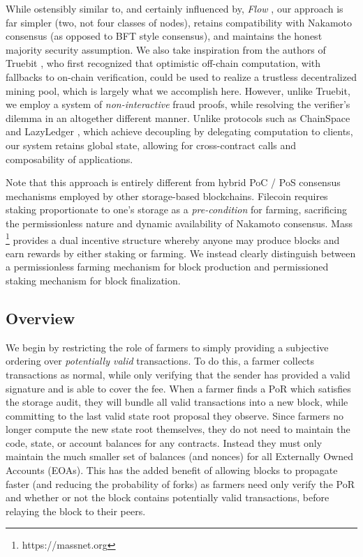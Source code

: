 \documentclass[conference]{IEEEtran}
\begin{document}
While ostensibly similar to, and certainly influenced by, \textit{Flow} \cite{ hentschel2019flow1, hentschel2020flow2, hentschel2019flow3}, our approach is far simpler (two, not four classes of nodes), retains compatibility with Nakamoto consensus (as opposed to BFT style consensus), and maintains the honest majority security assumption. We also take inspiration from the authors of Truebit \cite{teutsch2018truebit}, who first recognized that optimistic off-chain computation, with fallbacks to on-chain verification, could be used to realize a trustless decentralized mining pool, which is largely what we accomplish here. However, unlike Truebit, we employ a system of \textit{non-interactive} fraud proofs, while resolving the verifier’s dilemma in an altogether different manner. Unlike protocols such as ChainSpace \cite{al2017chainspace} and LazyLedger \cite{al2019lazyledger}, which achieve decoupling by delegating computation to clients, our system retains global state, allowing for cross-contract calls and composability of applications.

Note that this approach is entirely different from hybrid PoC / PoS consensus mechanisms employed by other storage-based blockchains. Filecoin \cite{benet2018filecoin} requires staking proportionate to one's storage as a \textit{pre-condition} for farming, sacrificing the permissionless nature and dynamic availability of Nakamoto consensus. Mass \footnote{https://massnet.org} provides a dual incentive structure whereby anyone may produce blocks and earn rewards by either staking or farming. We instead clearly distinguish between a permissionless farming mechanism for block production and permissioned staking mechanism for block finalization. 

\subsection{Overview}

We begin by restricting the role of farmers to simply providing a subjective ordering over \textit{potentially valid} transactions. To do this, a farmer collects transactions as normal, while only verifying that the sender has provided a valid signature and is able to cover the fee.  When a farmer finds a PoR which satisfies the storage audit, they will bundle all valid transactions into a new block, while committing to the last valid state root proposal they observe. Since farmers no longer compute the new state root themselves, they do not need to maintain the code, state, or account balances for any contracts. Instead they must only maintain the much smaller set of balances (and nonces) for all Externally Owned Accounts (EOAs). This has the added benefit of allowing blocks to propagate faster (and reducing the probability of forks) as farmers need only verify the PoR and whether or not the block contains potentially valid transactions, before relaying the block to their peers.
\end{document}
